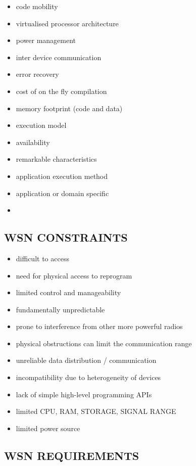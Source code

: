 \begin{itemize}
	\item code mobility
	\item virtualised processor architecture
	\item power management
	\item inter device communication
	\item error recovery
	\item cost of on the fly compilation
	\item memory footprint (code and data)
	\item execution model
	\item availability
	\item remarkable characteristics
	\item application execution method
	\item application or domain specific
	\item 
\end{itemize}	
	
\subsection{WSN CONSTRAINTS} 

\begin{itemize}
\item difficult to access
\item need for physical access to reprogram 
\item limited control and manageability
\item fundamentally unpredictable 

\item prone to interference from other more powerful radios
\item physical obstructions can limit the communication range
\item unreliable data distribution / communication

\item incompatibility due to heterogeneity of devices
\item lack of simple high-level programming APIs

\item limited CPU, RAM, STORAGE, SIGNAL RANGE
\item limited power source
\end{itemize}

\subsection{WSN REQUIREMENTS}

